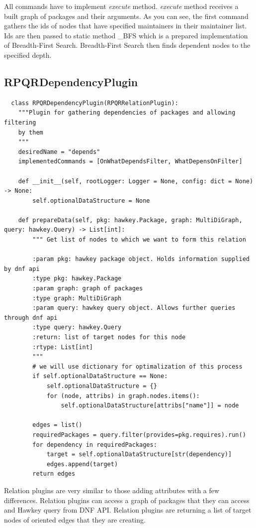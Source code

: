 All commands have to implement \textit{execute} method. \textit{execute} method receives a built graph
of packages and their arguments. As you can see, the first command gathers the ids of nodes that have specified
maintainers in their maintainer list. Ids are then passed to static method \_BFS which is a prepared
implementation of Breadth-First Search. Breadth-First Search then finds dependent nodes to the specified
depth.

\newpage

\subsection*{RPQRDependencyPlugin}

\begin{lstlisting}
  class RPQRDependencyPlugin(RPQRRelationPlugin):
    """Plugin for gathering dependencies of packages and allowing filtering
    by them
    """
    desiredName = "depends"
    implementedCommands = [OnWhatDependsFilter, WhatDepensOnFilter]

    def __init__(self, rootLogger: Logger = None, config: dict = None) -> None:
        self.optionalDataStructure = None

    def prepareData(self, pkg: hawkey.Package, graph: MultiDiGraph, query: hawkey.Query) -> List[int]:
        """ Get list of nodes to which we want to form this relation

        :param pkg: hawkey package object. Holds information supplied by dnf api
        :type pkg: hawkey.Package
        :param graph: graph of packages
        :type graph: MultiDiGraph
        :param query: hawkey query object. Allows further queries through dnf api
        :type query: hawkey.Query
        :return: list of target nodes for this node
        :rtype: List[int]
        """
        # we will use dictionary for optimalization of this process
        if self.optionalDataStructure == None:
            self.optionalDataStructure = {}
            for (node, attribs) in graph.nodes.items():
                self.optionalDataStructure[attribs["name"]] = node

        edges = list()
        requiredPackages = query.filter(provides=pkg.requires).run()
        for dependency in requiredPackages:
            target = self.optionalDataStructure[str(dependency)]
            edges.append(target)
        return edges
\end{lstlisting}

Relation plugins are very similar to those adding attributes with a few differences. Relation plugins
can access a graph of packages that they can access and Hawkey query from DNF API. Relation
plugins are returning a list of target nodes of oriented edges that they are creating.

